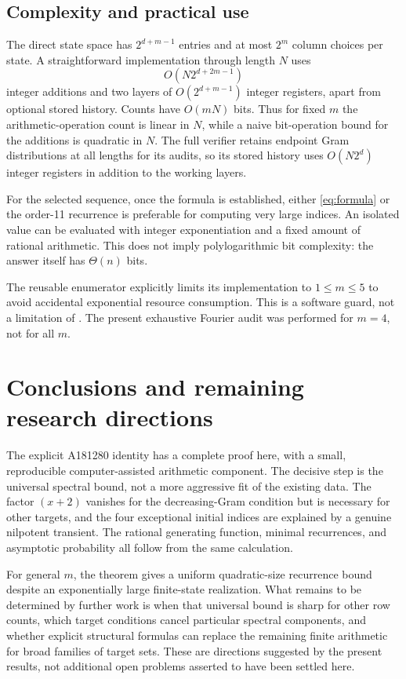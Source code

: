 \documentclass[11pt,letterpaper]{article}
\theoremstyle{definition}
\newcommand{\1}{\mathbf 1}
\begin{document}
\subsection{Complexity and practical use}
The direct state space has $2^{d+m-1}$ entries and at most $2^m$ column choices
per state. A straightforward implementation through length $N$ uses
\[
 O\!\left(N2^{d+2m-1}\right)
\]
integer additions and two layers of $O(2^{d+m-1})$ integer registers, apart from
optional stored history. Counts have $O(mN)$ bits. Thus for fixed $m$ the
arithmetic-operation count is linear in $N$, while a naive bit-operation bound
for the additions is quadratic in $N$. The full verifier retains endpoint
Gram distributions at all lengths for its audits, so its stored history uses
$O(N2^d)$ integer registers in addition to the working layers.

For the selected sequence, once the formula is established, either
\eqref{eq:formula} or the order-11 recurrence is preferable for computing very
large indices. An isolated value can be evaluated with integer exponentiation
and a fixed amount of rational arithmetic. This does not imply polylogarithmic
bit complexity: the answer itself has $\Theta(n)$ bits.

The reusable enumerator explicitly limits its implementation to $1\le m\le5$
to avoid accidental exponential resource consumption. This is a software guard,
not a limitation of . The present exhaustive Fourier audit
was performed for $m=4$, not for all $m$.

\section{Conclusions and remaining research directions}
\label{sec:conclusion}
The explicit A181280 identity has a complete proof here, with a small,
reproducible computer-assisted arithmetic component. The decisive step is the
universal spectral bound, not a more aggressive fit of the existing data.
The factor $(x+2)$ vanishes for the decreasing-Gram condition but is necessary
for other targets, and the four exceptional initial indices are explained by
a genuine nilpotent transient. The rational generating function, minimal
recurrences, and asymptotic probability all follow from the same calculation.

For general $m$, the theorem gives a uniform quadratic-size recurrence bound
despite an exponentially large finite-state realization. What remains to be
determined by further work is when that universal bound is sharp for other
row counts, which target conditions cancel particular spectral components,
and whether explicit structural formulas can replace the remaining finite
arithmetic for broad families of target sets. These are directions suggested
by the present results, not additional open problems asserted to have been
settled here.
\end{document}
